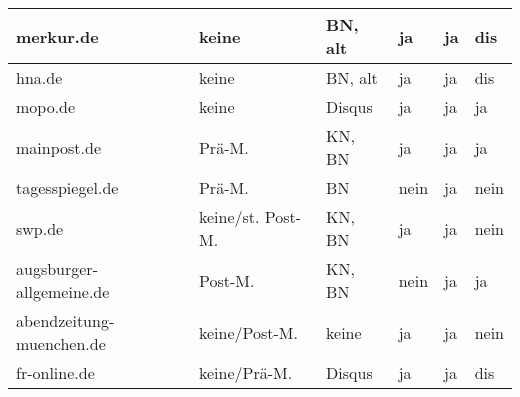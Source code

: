 \begin{table}
\begin{tabular}{p{28mm}*{5}{l}}
merkur.de
& keine
& BN, alt
& ja
& ja
& dis
\\*\midrule

hna.de
& keine
& BN, alt
& ja
& ja
& dis
\\*\midrule

mopo.de
& keine
& Disqus
& ja
& ja
& ja
\\*\midrule

mainpost.de
& Prä-M.
& KN, BN
& ja
& ja
& ja
\\*\midrule

tagesspiegel.de
& Prä-M.
& BN
& nein
& ja
& nein
\\*\midrule

swp.de
& keine/st. Post-M.
& KN, BN
& ja
& ja
& nein
\\*\midrule

augsburger-allgemeine.de
& Post-M.
& KN, BN
& nein
& ja
& ja
\\*\midrule

abendzeitung-muenchen.de
& keine/Post-M.
& keine
& ja
& ja
& nein

\\*\midrule

fr-online.de
& keine/Prä-M.
& Disqus
& ja
& ja
& dis

\\*\bottomrule

  \end{tabular}
\end{table}

